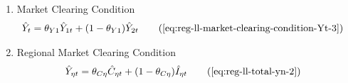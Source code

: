 \documentclass[../thesis.tex]{subfiles}
\begin{document}
{\begin{itemize}
\begin{enumerate}
		\item Market Clearing Condition
		\begin{align}
			\hat{Y}_{t} &= \theta_{Y1} \hat{Y}_{1t} + (1-\theta_{Y1}) \hat{Y}_{2t} \tag{\ref{eq:reg-ll-market-clearing-condition-Yt-3}}
		\end{align}
		
		\item Regional Market Clearing Condition
		\begin{align}
			\hat{Y}_{\eta t} &= \theta_{C\eta} \hat{C}_{\eta t} + (1 - \theta_{C\eta}) \hat{I}_{\eta t} \tag{\ref{eq:reg-ll-total-yn-2}}
		\end{align}
		
	\end{enumerate}
	
\end{itemize}

} %

\newpage
\end{document}
